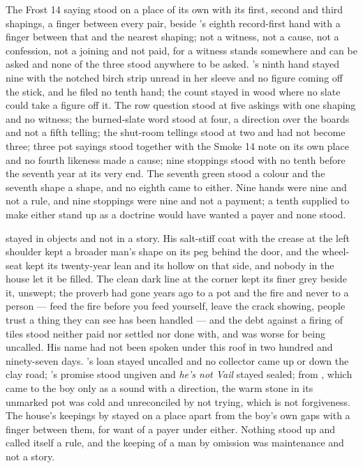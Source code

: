 The Frost 14 saying stood on a place of its own with its first, second and third shapings, a finger between every pair, beside 's eighth record-first hand with a finger between that and the nearest shaping; not a witness, not a cause, not a confession, not a joining and not paid, for a witness stands somewhere and can be asked and none of the three stood anywhere to be asked. 's ninth hand stayed nine with the notched birch strip unread in her sleeve and no figure coming off the stick, and he filed no tenth hand; the count stayed in wood where no slate could take a figure off it. The row question stood at five askings with one shaping and no witness; the burned-slate word stood at four, a direction over the boards and not a fifth telling; the shut-room tellings stood at two and had not become three; three pot sayings stood together with the Smoke 14 note on its own place and no fourth likeness made a cause; nine stoppings stood with no tenth before the seventh year at its very end. The seventh green stood a colour and the seventh shape a shape, and no eighth came to either. Nine hands were nine and not a rule, and nine stoppings were nine and not a payment; a tenth supplied to make either stand up as a doctrine would have wanted a payer and none stood.

 stayed in objects and not in a story. His salt-stiff coat with the crease at the left shoulder kept a broader man's shape on its peg behind the door, and the wheel-seat kept its twenty-year lean and its hollow on that side, and nobody in the house let it be filled. The clean dark line at the corner kept its finer grey beside it, unswept; the proverb had gone years ago to a pot and the fire and never to a person --- feed the fire before you feed yourself, leave the crack showing, people trust a thing they can see has been handled --- and the debt against a firing of tiles stood neither paid nor settled nor done with, and was worse for being uncalled. His name had not been spoken under this roof in two hundred and ninety-seven days. 's loan stayed uncalled and no collector came up or down the clay road; 's promise stood ungiven and \emph{he's not Vail} stayed sealed; from , which came to the boy only as a sound with a direction, the warm stone in its unmarked pot was cold and unreconciled by not trying, which is not forgiveness. The house's keepings by  stayed on a place apart from the boy's own gaps with a finger between them, for want of a payer under either. Nothing stood up and called itself a rule, and the keeping of a man by omission was maintenance and not a story.

